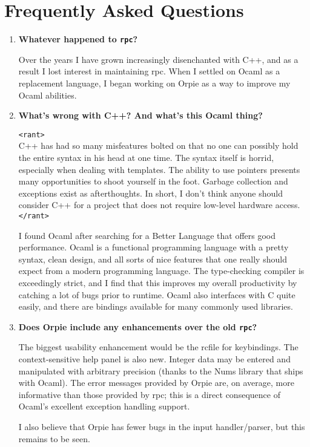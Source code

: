 \documentclass[11pt,notitlepage]{article}
\begin{document}
\section{Frequently Asked Questions}
\begin{enumerate}
   \item {\bf Whatever happened to {\tt rpc}?}

      Over the years I have grown increasingly disenchanted with C++, and
      as a result I lost interest in maintaining rpc.  When I settled on Ocaml
      as a replacement language, I began working on Orpie as a way to improve
      my Ocaml abilities.

   \item {\bf What's wrong with C++?  And what's this Ocaml thing?}

      {\tt <rant>} \\
      C++ has had so many misfeatures bolted on that no one can possibly hold
      the entire syntax in his head at one time.  The syntax itself is horrid,
      especially when dealing with templates.  The ability to use pointers
      presents many opportunities to shoot yourself in the foot.
      Garbage collection and exceptions exist as afterthoughts.  In short, I
      don't think anyone should consider C++ for a project that does not require
      low-level hardware access. \\
      {\tt </rant>} 
     
      I found Ocaml after searching for a Better Language that offers good
      performance.  Ocaml is a functional programming language with a pretty
      syntax, clean design, and all sorts of nice features that one really
      should expect from a modern programming language.  The type-checking 
      compiler is exceedingly strict, and I find that this improves my
      overall productivity by catching a lot of bugs prior to runtime.  Ocaml
      also interfaces with C quite easily, and there are bindings available
      for many commonly used libraries.

   \item {\bf Does Orpie include any enhancements over the old {\tt rpc}?}

      The biggest usability enhancement would be the rcfile for keybindings.
      The context-sensitive help panel is also new.  Integer data may be
      entered and manipulated with arbitrary precision (thanks to the Nums 
      library that ships with Ocaml).  The error messages provided by
      Orpie are, on average, more informative than those provided by rpc;
      this is a direct consequence of Ocaml's excellent exception handling
      support.

      I also believe that Orpie has fewer bugs in the input handler/parser,
      but this remains to be seen.
\end{enumerate}
\end{document}
